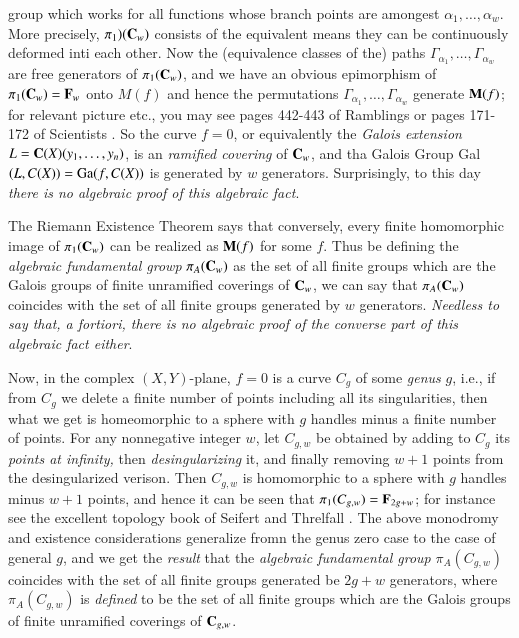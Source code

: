 group which works for all functions whose branch points are amongest $\alpha_{1}, \ldots, \alpha_{w}$. More precisely, $\pi_{1})(\mathbf{C}_{w})$ consists of the equivalent means they can be continuously deformed inti each other. Now the (equivalence classes of the) paths $\Gamma_{\alpha_{1}}, \ldots, \Gamma_{\alpha_{w}}$ are free generators of $\pi_{1}(\mathbf{C}_{w})$, and we have an obvious epimorphism of $\pi_{1}(\mathbf{C}_{w})= \mathbf{F}_{w}$ onto $M(f)$ and hence the permutations $\Gamma_{\alpha_{1}}, \ldots, \Gamma_{\alpha_{w}}$ generate $\mathbf{M}(f)$; for relevant picture etc., you may see pages 442-443 of Ramblings \cite{art1-key5} or pages 171-172 of Scientists \cite{art1-key6}. So the curve $f=0$, or equivalently the \textit{Galois extension} $L=\mathbf{C}(X)(y_{1}, \ldots, y_{n})$, is an \textit{ramified covering} of $\mathbf{C}_{w}$, and tha Galois Group Gal$(L, C(X)) = {\rm Ga}(f, C(X))$ is generated by $w$ generators. Surprisingly, to this day \textit{there is no algebraic proof of this algebraic fact}.

The Riemann Existence Theorem says that conversely, every finite homomorphic image of $\pi_{1}(\mathbf{C}_{w})$ can be realized as $\mathbf{M}(f)$ for some $f$. Thus be defining the \textit{algebraic fundamental growp} $\pi_{A}(\mathbf{C}_{w})$ as the set of all finite groups which are the Galois groups of finite unramified coverings of $\mathbf{C}_{w}$, we can say that $\pi_{A}(\mathbf{C}_{w})$ coincides with the set of all  finite groups generated by $w$ generators. \textit{Needless to say that, a fortiori, there is no algebraic proof of the converse part of this algebraic fact either}.

Now, in the complex $(X, Y)$-plane, $f=0$ is a curve $C_{g}$ of some \textit{genus} $g$, i.e., if from $C_{g}$ we delete a finite number of points including all its singularities, then what we get is homeomorphic to a sphere with $g$ handles minus a finite number of points. For any nonnegative integer $w$, let $C_{g,w}$ be obtained by adding to $C_{g}$ its \textit{points at infinity,} then \textit{desingularizing} it, and finally removing $w+1$ points from the desingularized verison. Then $C_{g,w}$ is homomorphic to a sphere with $g$ handles minus $w+1$ points, and hence it can be seen that $\pi_{1}(C_{g,w})=\mathbf{F}_{2g+w}$; for instance see the excellent topology book of Seifert and Threlfall \cite{art1-key54}. The above monodromy and existence considerations generalize fromn the genus zero case to the case of general $g$, and we get the \textit{result} that the \textit{algebraic fundamental group} $\pi_{A}(C_{g,w})$ coincides with the set of all finite groups generated be $2g+w$ generators, where $\pi_{A}(C_{g,w})$ is \textit{defined} to be the set of all finite groups which are the Galois groups of finite unramified coverings of $\mathbf{C}_{g,w}$.

